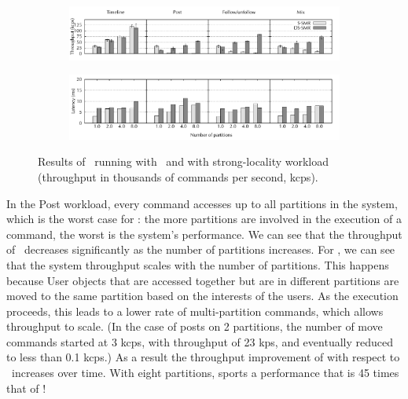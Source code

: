 \begin{figure}[ht!]
\centering
\begin{subfigure}{1\columnwidth}
      \centering
      \includegraphics[width=\textwidth]{./figures/experiments/dssmr/dssmr-strong-locality-tp}
\end{subfigure}
\begin{subfigure}{1\columnwidth}
      \centering
      \includegraphics[width=\textwidth]{./figures/experiments/dssmr/dssmr-strong-locality-lat}
\end{subfigure}
\caption{Results of \dssmrappname\ running with \ssmr\ and \dssmr{} with strong-locality workload (throughput in thousands of commands per second, kcps).}
\label{fig:dssmr-strongloc}
\end{figure}

In the Post workload, every command accesses up to all partitions in the system,
which is the worst case for \ssmr{}: the more partitions are involved in the
execution of a command, the worst is the system's performance. We can see that
the throughput of \ssmr\ decreases significantly as the number of partitions
increases. For \dssmr{}, we can see that the system throughput scales with the
number of partitions. This happens because User objects that are accessed
together but are in different partitions are moved to the same partition
based on the interests of the users. As the execution proceeds, this leads to a
lower rate of multi-partition commands, which allows throughput to scale. (In
the case of posts on 2 partitions, the number of move commands started at 3
kcps, with throughput of 23 kps, and eventually reduced to less than 0.1 kcps.)
As a result the throughput improvement of \dssmr{} with respect to \ssmr\
increases over time. With eight partitions, \dssmr{} sports a performance that
is 45 times that of \ssmr!


